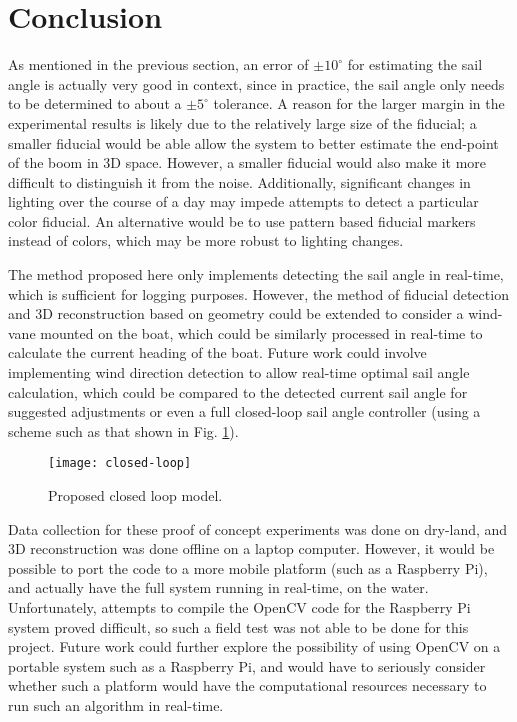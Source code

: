 \documentclass[letterpaper, 10 pt, conference]{ieeeconf}  %
\begin{document}
\section{Conclusion}
As mentioned in the previous section, an error of $\pm 10^\circ$ for estimating the sail angle is actually very good in context, since in practice, the sail angle only needs to be determined to about a $\pm 5^\circ$ tolerance. A reason for the larger margin in the experimental results is likely due to the relatively large size of the fiducial; a smaller fiducial would be able allow the system to better estimate the end-point of the boom in 3D space. However, a smaller fiducial would also make it more difficult to distinguish it from the noise. Additionally, significant changes in lighting over the course of a day may impede attempts to detect a particular color fiducial. An alternative would be to use pattern based fiducial markers instead of colors, which may be more robust to lighting changes. 

The method proposed here only implements detecting the sail angle in real-time, which is sufficient for logging purposes. However, the method of fiducial detection and 3D reconstruction based on geometry could be extended to consider a wind-vane mounted on the boat, which could be similarly processed in real-time to calculate the current heading of the boat. Future work could involve implementing wind direction detection to allow real-time optimal sail angle calculation, which could be compared to the detected current sail angle for suggested adjustments or even a full closed-loop sail angle controller (using a scheme such as that shown in Fig. \ref{fig:closed}). 

\begin{figure}[htbp]
  \centering
   \texttt{[image: closed-loop]} 
  \caption{Proposed closed loop model. }
   \label{fig:closed}
\end{figure}

Data collection for these proof of concept experiments was done on dry-land, and 3D reconstruction was done offline on a laptop computer. However, it would be possible to port the code to a more mobile platform (such as a Raspberry Pi), and actually have the full system running in real-time, on the water. Unfortunately, attempts to compile the OpenCV code for the Raspberry Pi system proved difficult, so such a field test was not able to be done for this project. Future work could further explore the possibility of using OpenCV on a portable system such as a Raspberry Pi, and would have to seriously consider whether such a platform would have the computational resources necessary to run such an algorithm in real-time. 
\end{document}
